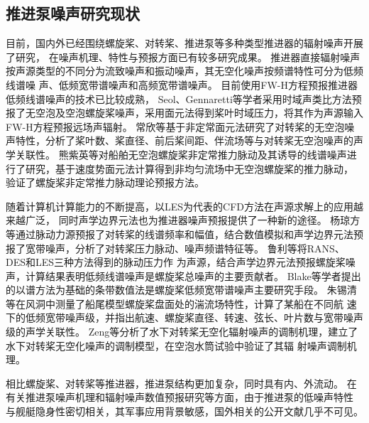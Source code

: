 \subsection{推进泵噪声研究现状}
目前，国内外已经围绕螺旋桨、对转桨、推进泵等多种类型推进器的辐射噪声开展了研究，
在噪声机理、特性与预报方面已有较多研究成果。
推进器直接辐射噪声按声源类型的不同分为流致噪声和振动噪声，其无空化噪声按频谱特性可分为低频线谱噪
声、低频宽带谱噪声和高频宽带谱噪声\cite{cheng2019,xuye2019a}。
目前使用FW-H方程预报推进器低频线谱噪声的技术已比较成熟，
Seol、Gennaretti等学者采用时域声类比方法预报了无空泡及空泡螺旋桨噪声，采用面元法得到桨叶时域压力，将其作为声源输入FW-H方程预报远场声辐射\cite{seol2002,gennaretti2012}。
常欣等\cite{changxin2018}基于非定常面元法研究了对转桨的无空泡噪声特性，分析了桨叶数、桨直径、前后桨间距、伴流场等与对转桨无空泡噪声的声学关联性。
熊紫英等\cite{xiong2014}对船舶无空泡螺旋桨非定常推力脉动及其诱导的线谱噪声进行了研究，基于速度势面元法计算得到非均匀流场中无空泡螺旋桨的推力脉动，
验证了螺旋桨非定常推力脉动理论预报方法。

随着计算机计算能力的不断提高，以LES为代表的CFD方法在声源求解上的应用越来越广泛，
同时声学边界元法也为推进器噪声预报提供了一种新的途径。
杨琼方等\cite{__2016杨琼方}通过脉动力源预报了对转桨的线谱频率和幅值，结合数值模拟和声学边界元法预报了宽带噪声，分析了对转桨压力脉动、噪声频谱特征等。
鲁利等\cite{鲁利}将RANS、DES和LES三种方法得到的脉动压力作
为声源，结合声学边界元法预报螺旋桨噪声，计算结果表明低频线谱噪声是螺旋桨总噪声的主要贡献者。
Blake等学者提出的以谱方法为基础的条带数值法是螺旋桨低频宽带谱噪声主要研究手段\cite{1986Mechanics,jiang2020}。
朱锡清等\cite{朱锡清2006}在风洞中测量了船尾模型螺旋桨盘面处的湍流场特性，计算了某船在不同航
速下的低频宽带噪声级，并指出航速、螺旋桨直径、转速、弦长、叶片数与宽带噪声级的声学关联性。
Zeng等\cite{zeng2017,zeng2020a}分析了水下对转桨无空化辐射噪声的调制机理，建立了水下对转桨无空化噪声的调制模型，在空泡水筒试验中验证了其辐
射噪声调制机理。

相比螺旋桨、对转桨等推进器，推进泵结构更加复杂，同时具有内、外流动。
在有关推进泵噪声机理和辐射噪声数值预报研究等方面，由于推进泵的低噪声特性
与舰艇隐身性密切相关，其军事应用背景敏感，国外相关的公开文献几乎不可见。

